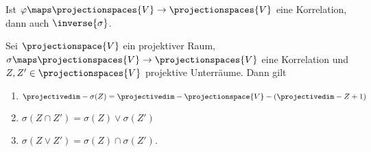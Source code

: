 \begin{bemerkung*}
  Ist \( \varphi\maps \projectionspaces{V}\to \projectionspaces{V} \) eine Korrelation, dann auch \( \inverse{\sigma} \).
\end{bemerkung*}
\begin{lemma}
  Sei \( \projectionspace{V} \) ein projektiver Raum, \( \sigma\maps \projectionspaces{V}\to \projectionspaces{V} \) eine Korrelation und \( Z,Z'\in \projectionspaces{V} \) projektive Unterräume. Dann gilt
  \begin{enumerate}
    \item \label{dimension_unter_korrelation} \( \projectivedim-{\sigma(Z)}=\projectivedim-{\projectionspace{V}}-(\projectivedim-{Z}+1) \)
    \item \label{schnitt_unter_korrelation} \( \sigma(Z\cap Z')=\sigma(Z)\vee \sigma(Z') \)
    \item \label{verbindung_unter_korrelation} \( \sigma(Z\vee Z')=\sigma(Z)\cap \sigma(Z') \).
  \end{enumerate}
\end{lemma}
